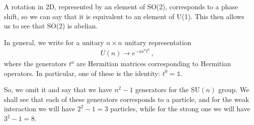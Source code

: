 \documentclass[main.tex]{subfiles}
\begin{document}
A rotation in 2D, represented by an element of SO(2), corresponds to a phase shift, so we can say that it is equivalent to an element of U(1).
This then allows us to see that SO(2) is abelian. 

In general, we write for a unitary \(n \times n\) unitary representation
%
\begin{align}
U(n) \rightarrow e^{-i \alpha^{n} t^{a}}
\,,
\end{align}
%
where the generators \(t^{a}\) are Hermitian matrices corresponding to Hermitian operators. 
In particular, one of these is the identity: \(t^{0} = \mathbb{1}\). 

So, we omit it and  say that we have \(n^2-1\) generators for the SU\((n)\) group.
We shall see that each of these generators corresponds to a particle, and for the weak interaction we will have \(2^2-1 = 3\) particles, while for the strong one we will have \(3^2-1=8\). 
\end{document}

